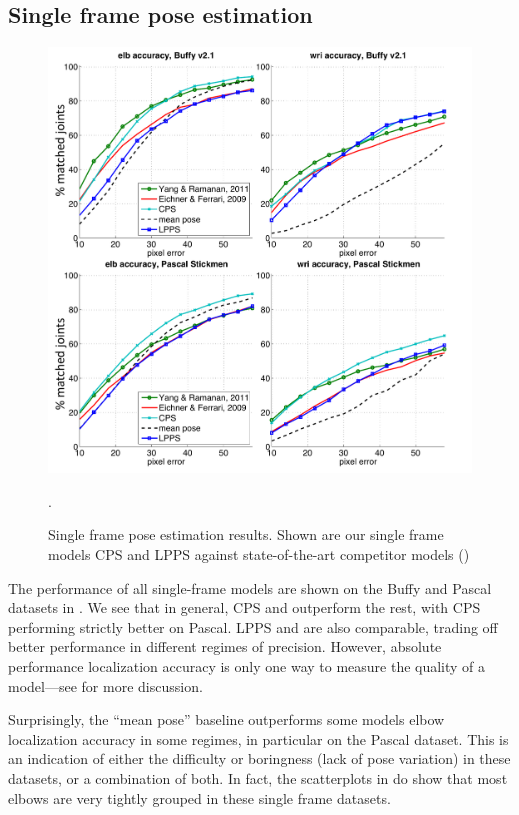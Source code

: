 \subsection{Single frame pose estimation}
\begin{figure}[tb]
\begin{center}
\includegraphics[width=1.00\textwidth]{figs/results-buffy-pascal.pdf}
\caption[Single frame pose estimation results.]{Single frame pose estimation 
results.  Shown are our single frame models CPS and LPPS against 
state-of-the-art competitor models ()}.
\label{fig:results-buffy-pascal}
\end{center}
\end{figure}
The performance of all single-frame models are shown on the Buffy and Pascal 
datasets in .  We see that in general, CPS and 
\citet{deva2011} outperform the rest, with CPS performing strictly better on 
Pascal.  LPPS and \citet{eichner09} are also comparable, trading off better 
performance in different regimes of precision.   However, absolute performance 
localization accuracy is only one way to measure the quality of a model---see 
 for more discussion.

Surprisingly, the ``mean pose'' baseline outperforms some models elbow 
localization accuracy in some regimes, in particular on the Pascal dataset.  
This is an indication of either the difficulty or boringness (lack of pose 
variation) in these datasets, or a combination of both.  In fact, the 
scatterplots in  do show that most elbows are very 
tightly grouped in these single frame datasets. 

